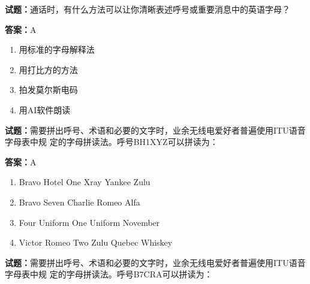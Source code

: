 \documentclass{ctexbook}
\begin{document}




\vspace{1em}

\textbf{试题：}通话时，有什么方法可以让你清晰表述呼号或重要消息中的英语字母？ 

\textbf{答案：}A 

\begin{enumerate}[leftmargin=3em]
  \item 用标准的字母解释法 

  \item 用打比方的方法 

  \item 拍发莫尔斯电码 

  \item 用AI软件朗读 

\end{enumerate}





\vspace{1em}

\textbf{试题：}需要拼出呼号、术语和必要的文字时，业余无线电爱好者普遍使用ITU语音字母表中规
定的字母拼读法。呼号BH1XYZ可以拼读为： 

\textbf{答案：}A 

\begin{enumerate}[leftmargin=3em]
  \item Bravo Hotel One Xray Yankee Zulu 

  \item Bravo Seven Charlie Romeo Alfa 

  \item Four Uniform One Uniform November 

  \item Victor Romeo Two Zulu Quebec Whiskey 

\end{enumerate}





\vspace{1em}

\textbf{试题：}需要拼出呼号、术语和必要的文字时，业余无线电爱好者普遍使用ITU语音字母表中规
定的字母拼读法。呼号B7CRA可以拼读为： 
\end{document}
